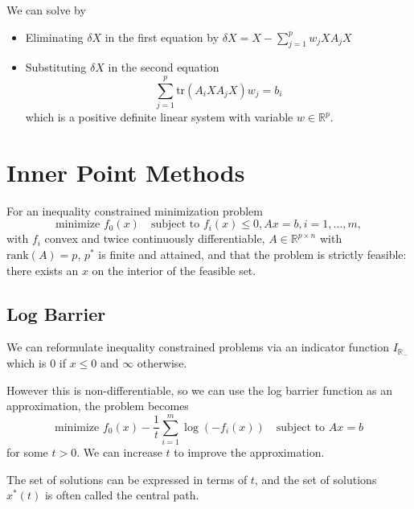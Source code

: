 \documentclass[11pt]{article}
\begin{document}
We can solve by 
\begin{itemize}
    \item Eliminating $\delta X$ in the first equation by $\delta X = X - \sum_{j=1}^p w_jXA_jX$
    \item Substituting $\delta X$ in the second equation 
    \[ \sum_{j=1}^p \mathrm{tr}(A_iXA_j X) w_j = b_i \] 
    which is a positive definite linear system with variable $w \in \mathbb{R}^p$. 
\end{itemize}

\newpage 
\section{Inner Point Methods} 
For an inequality constrained minimization problem 
\[ \text{minimize } f_0(x) \quad \text{subject to } f_i(x) \leq 0, Ax = b, i = 1, \ldots, m, \] 
with $f_i$ convex and twice continuously differentiable, $A \in \mathbb{R}^{p \times n}$ with $\mathrm{rank}(A) = p$, $p^*$ is finite and attained, and that the problem is strictly feasible: there exists an $x$ on the interior of the feasible set. \par

\subsection{Log Barrier} 
We can reformulate inequality constrained problems via an indicator function $I_{\mathbb{R}_-}$ which is $0$ if $x \leq 0$ and $\infty$ otherwise. \par 
However this is non-differentiable, so we can use the log barrier function as an approximation, the problem becomes 
\[ \text{minimize } f_0(x) - \frac{1}{t} \sum_{i=1}^m \log(-f_i(x)) \quad \text{subject to } Ax = b \] 
for some $t > 0$. We can increase $t$ to improve the approximation. \par

The set of solutions can be expressed in terms of $t$, and the set of solutions $x^*(t)$ is often called the central path. \par 
\end{document}

